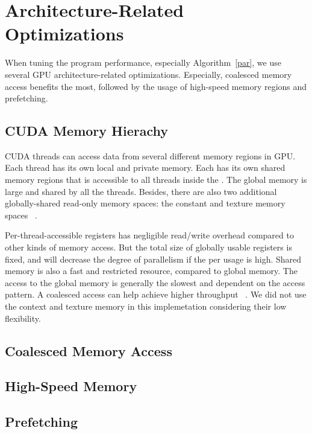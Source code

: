 \section{Architecture-Related Optimizations}
\label{s:optimization}

When tuning the program performance, especially Algorithm~\ref{par}, we use several
GPU architecture-related optimizations. Especially, coalesced memory access 
benefits the most, followed by the usage of high-speed memory regions and
prefetching.

\subsection{CUDA Memory Hierachy}

CUDA threads can access data from several different memory regions in GPU. Each 
thread has its own local and private memory. Each \TB has its own shared
memory regions that is accessible to all threads inside the \TB. The
global memory is large and shared by all the threads. Besides, there are also two 
additional globally-shared read-only memory spaces: the constant and texture memory
spaces ~\cite{cuda-program-guide}.

Per-thread-accessible registers has negligible read/write overhead compared to 
other kinds of memory access. But the total size of globally usable registers is 
fixed, and will decrease the degree of parallelism if the per \TB usage is high.
Shared memory is also a fast and restricted resource, compared to global memory.
The access to the global memory is generally the slowest and dependent on the 
access pattern. A coalesced access can help achieve higher throughput
~\cite{kepler-tuning}. We did not use the context and texture memory in this 
implemetation considering their low flexibility.


\subsection{Coalesced Memory Access}

\subsection{High-Speed Memory}


\subsection{Prefetching}

